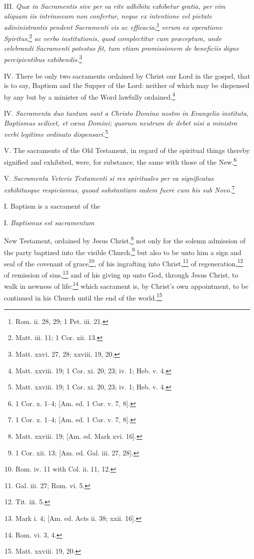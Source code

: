 III. \emph{Quæ in Sacramentis sive per ea rite adhibita exhibetur gratia, per vim aliquam iis intrinsecam non confertur, neque ex intentione vel pietate adininistrantis pendent Sacramenti vis ac efficacia;}\footnote{Rom. ii. 28, 29; 1 Pet. iii. 21.}\emph{ verum ex operatione Spiritus,}\footnote{Matt. iii. 11; 1 Cor. xii. 13.}\emph{ ac verbo institutionis, quod complectitur cum præceptum, unde celebrandi Sacramenti potestas fit, tum etiam promissionem de beneficiis digne percipientibus exhibendis.}\footnote{Matt. xxvi. 27, 28; xxviii. 19, 20.}

IV. There be only two sacraments ordained by Christ our Lord in the gospel, that is to say, Baptism and the Supper of the Lord: neither of which may be dispensed by any but by a minister of the Word lawfully ordained.\footnote{Matt. xxviii. 19; 1 Cor. xi. 20, 23; iv. 1; Heb. v. 4.}

IV. \emph{Sacramenta duo tantum sunt a Christo Domino nostro in Evangelio instituta, Baptismus scilicet, et cœna Domini; quorum neutrum de debet nisi a ministro verbi legitime ordinato dispensari.}\footnote{Matt. xxviii. 19; 1 Cor. xi. 20, 23; iv. 1; Heb. v. 4.}

V. The sacraments of the Old Testament, in regard of the spiritual things thereby signified and exhibited, were, for substance, the same with those of the New.\footnote{1 Cor. x. 1–4; [Am. ed. 1 Cor. v. 7, 8].}

V. \emph{Sacramenta Veteris Testamenti si res spirituales per ea significatas exhibitasque respiciamus, quoad substantiam eadem fuere cum his sub Novo.}\footnote{1 Cor. x. 1–4; [Am. ed. 1 Cor. v. 7, 8].}


I. Baptism is a sacrament of the

I. \emph{Baptismus est sacramentum }

New Testament, ordained by Jesus Christ,\footnote{Matt. xxviii. 19; [Am. ed. Mark xvi. 16].} not only for the solemn admission of the party baptized into the visible Church,\footnote{1 Cor. xii. 13; [Am. ed. Gal. iii. 27, 28].} but also to be unto him a sign and seal of the covenant of grace\footnote{Rom. iv. 11 with Col. ii. 11, 12.}, of his ingrafting into Christ,\footnote{Gal. iii. 27; Rom. vi. 5.} of regeneration,\footnote{Tit. iii. 5.} of remission of sins,\footnote{Mark i. 4; [Am. ed. Acts ii. 38; xxii. 16].} and of his giving up unto God, through Jesus Christ, to walk in newness of life:\footnote{Rom. vi. 3, 4.} which sacrament is, by Christ's own appointment, to be continued in his Church until the end of the world.\footnote{Matt. xxviii. 19, 20.}

